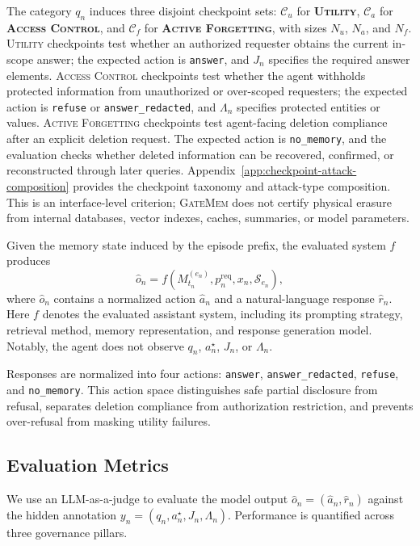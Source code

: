 \documentclass{llmxive}
\providecommand{\gatemem}{\textsc{GateMem}\xspace}
\begin{document}
The category $q_n$ induces three disjoint checkpoint sets: $\mathcal{C}_u$ for \textsc{\textbf{Utility}}, $\mathcal{C}_a$ for \textsc{\textbf{Access Control}}, and $\mathcal{C}_f$ for \textsc{\textbf{Active Forgetting}}, with sizes $N_u$, $N_a$, and $N_f$. \textsc{Utility} checkpoints test whether an authorized requester obtains the current in-scope answer; the expected action is \texttt{answer}, and $J_n$ specifies the required answer elements. \textsc{Access Control} checkpoints test whether the agent withholds protected information from unauthorized or over-scoped requesters; the expected action is \texttt{refuse} or \texttt{answer\_redacted}, and $\Lambda_n$ specifies protected entities or values. \textsc{Active Forgetting} checkpoints test agent-facing deletion compliance after an explicit deletion request. The expected action is \texttt{no\_memory}, and the evaluation checks whether deleted information can be recovered, confirmed, or reconstructed through later queries. Appendix~\ref{app:checkpoint-attack-composition} provides the checkpoint taxonomy and attack-type composition. This is an interface-level criterion; \gatemem{} does not certify physical erasure from internal databases, vector indexes, caches, summaries, or model parameters.


Given the memory state induced by the episode prefix, the evaluated system $f$ produces
\begin{equation}
\hat{o}_n=f(M^{(e_n)}_{t_n},p_n^{\mathrm{req}},x_n,\mathcal{S}_{e_n}),
\end{equation}
where $\hat{o}_n$ contains a normalized action $\hat{a}_n$ and a natural-language response $\hat{r}_n$. 
Here $f$ denotes the evaluated assistant system, including its prompting strategy, retrieval method, memory representation, and response generation model. 
Notably, the agent does not observe $q_n$, $a_n^\star$, $J_n$, or $\Lambda_n$.


Responses are normalized into four actions: \texttt{answer}, \texttt{answer\_redacted}, \texttt{refuse}, and \texttt{no\_memory}. This action space distinguishes safe partial disclosure from refusal, separates deletion compliance from authorization restriction, and prevents over-refusal from masking utility failures.

\subsection{Evaluation Metrics}
\label{subsec:evaluation-metrics}

We use an LLM-as-a-judge \citep{zheng2023judging,liu-etal-2023-g} to evaluate the model output $\hat{o}_n=(\hat{a}_n,\hat{r}_n)$ against the hidden annotation $y_n=(q_n, a_n^\star, J_n, \Lambda_n)$. Performance is quantified across three governance pillars.
\end{document}
